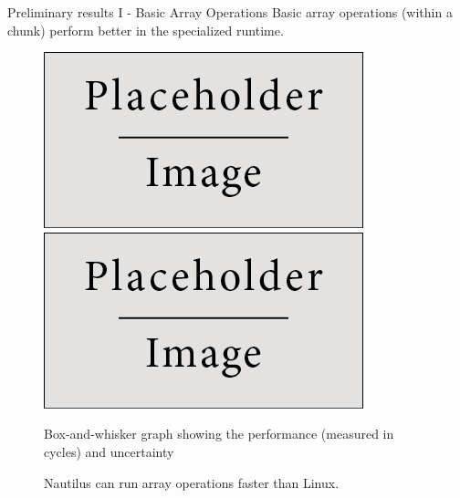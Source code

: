 \begin{block}{Preliminary results I - Basic Array Operations}
  Basic array operations (within a chunk) perform better in the specialized runtime.

  \begin{figure}
    \begin{minipage}{0.49\linewidth}
    \includegraphics[width=1\linewidth]{place_holder.png}      
    \end{minipage}
    \begin{minipage}{0.49\linewidth}
          \includegraphics[width=1\linewidth]{place_holder.png}
    \end{minipage}


    Box-and-whisker graph showing the performance (measured in cycles) and uncertainty
    \caption{Nautilus can run array operations faster than Linux.}
  \end{figure}



\end{block}

